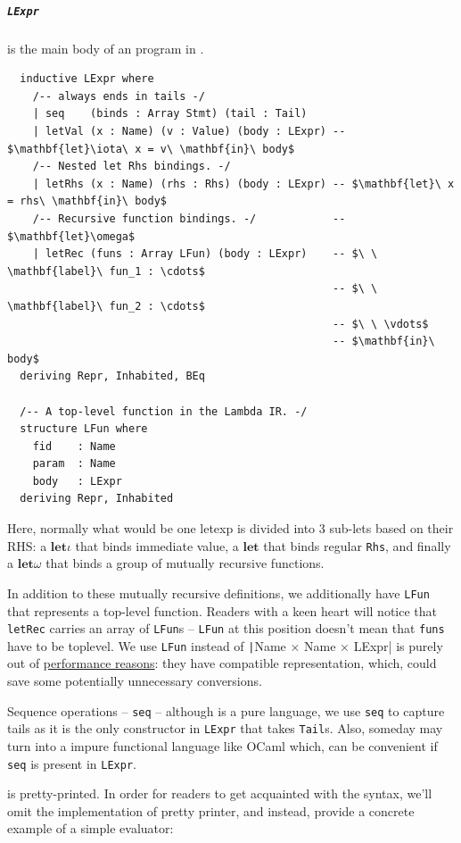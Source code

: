 \documentclass[a4paper, 11pt]{article}
\theoremstyle{remark}\newtheorem*{remark}{Remark}
\theoremstyle{definition}\newtheorem*{definition}{Definition}
\begin{document}
\subparagraph{\texttt{LExpr}} is the main body of an program in \Lambdair.
\begin{verbatim}
  inductive LExpr where
    /-- always ends in tails -/
    | seq    (binds : Array Stmt) (tail : Tail)
    | letVal (x : Name) (v : Value) (body : LExpr) -- $\mathbf{let}\iota\ x = v\ \mathbf{in}\ body$
    /-- Nested let Rhs bindings. -/
    | letRhs (x : Name) (rhs : Rhs) (body : LExpr) -- $\mathbf{let}\ x = rhs\ \mathbf{in}\ body$
    /-- Recursive function bindings. -/            -- $\mathbf{let}\omega$
    | letRec (funs : Array LFun) (body : LExpr)    -- $\ \ \mathbf{label}\ fun_1 : \cdots$
                                                   -- $\ \ \mathbf{label}\ fun_2 : \cdots$
                                                   -- $\ \ \vdots$
                                                   -- $\mathbf{in}\ body$
  deriving Repr, Inhabited, BEq

  /-- A top-level function in the Lambda IR. -/
  structure LFun where
    fid    : Name
    param  : Name
    body   : LExpr
  deriving Repr, Inhabited
\end{verbatim}
Here, normally what would be one letexp is divided into 3 sub-lets based on their RHS: a $\mathbf{let}\iota$ that binds
immediate value, a $\mathbf{let}$ that binds regular \texttt{Rhs}, and finally a $\mathbf{let}\omega$
that binds a group of mutually recursive functions.

In addition to these mutually recursive definitions, we additionally have \texttt{LFun} that represents a
top-level function. Readers with a keen heart will notice that \texttt{letRec} carries an array
of \texttt{LFun}s -- \texttt{LFun} at this position doesn't mean that \texttt{funs} have to be toplevel.
We use \texttt{LFun} instead of \texttt|Name × Name × LExpr|
is purely out of \underline{performance reasons}: they have compatible representation, which, could
save some potentially unnecessary conversions.

Sequence operations -- \texttt{seq} -- although \Tigris is a pure language, we use \texttt{seq} to capture tails as
it is the only constructor in \texttt{LExpr} that takes \texttt{Tail}s. Also, someday may turn \Tigris into a
impure functional language like OCaml which, can be convenient if \texttt{seq} is present in \texttt{LExpr}.

\Lambdair is pretty-printed. In order for readers to get acquainted with the syntax, we'll omit the implementation of pretty printer, and instead, provide a concrete example of a simple evaluator:
\end{document}
